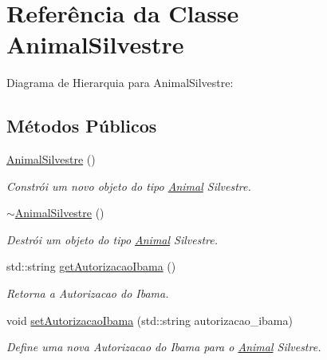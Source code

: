 \hypertarget{classAnimalSilvestre}{}\section{Referência da Classe Animal\+Silvestre}
\label{classAnimalSilvestre}


Diagrama de Hierarquia para Animal\+Silvestre\+:
\subsection*{Métodos Públicos}
\begin{DoxyCompactItemize}
\item 
\mbox{\label{classAnimalSilvestre_ab399a508e477d58526bdde4c49365488}} 
\hyperlink{classAnimalSilvestre_ab399a508e477d58526bdde4c49365488}{Animal\+Silvestre} ()
\begin{DoxyCompactList}\small\item\em Constrói um novo objeto do tipo \hyperlink{classAnimal}{Animal} Silvestre. \end{DoxyCompactList}\item 
\mbox{\label{classAnimalSilvestre_a3c7b842e393cda436f252c4eb6021aaa}} 
\hyperlink{classAnimalSilvestre_a3c7b842e393cda436f252c4eb6021aaa}{$\sim$\+Animal\+Silvestre} ()
\begin{DoxyCompactList}\small\item\em Destrói um objeto do tipo \hyperlink{classAnimal}{Animal} Silvestre. \end{DoxyCompactList}\item 
std\+::string \hyperlink{classAnimalSilvestre_a040b1391d175d7572d11deddc7b3e8cb}{get\+Autorizacao\+Ibama} ()
\begin{DoxyCompactList}\small\item\em Retorna a Autorizacao do Ibama. \end{DoxyCompactList}\item 
void \hyperlink{classAnimalSilvestre_ae7c8a7c193ff93fafe05419ff1c5db18}{set\+Autorizacao\+Ibama} (std\+::string autorizacao\+\_\+ibama)
\begin{DoxyCompactList}\small\item\em Define uma nova Autorizacao do Ibama para o \hyperlink{classAnimal}{Animal} Silvestre. \end{DoxyCompactList}\end{DoxyCompactItemize}
